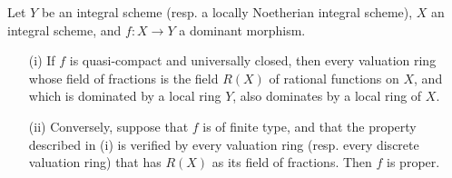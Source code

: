 \begin{corollary}[7.3.10]
\label{II.7.3.10}
Let $Y$ be an integral scheme (resp. a locally Noetherian integral scheme), $X$ an integral scheme, and $f:X\to Y$ a dominant morphism.
\begin{enumerate}
    \item[\rm{(i)}] If $f$ is quasi-compact and universally closed, then every valuation ring whose field of fractions is the field $R(X)$ of rational functions on $X$, and which is dominated by a local ring $Y$, also dominates by a local ring of $X$.
    \item[\rm{(ii)}] Conversely, suppose that $f$ is of finite type, and that the property described in (i) is verified by every valuation ring (resp. every discrete valuation ring) that has $R(X)$ as its field of fractions.
        Then $f$ is proper.
\end{enumerate}
\end{corollary}

